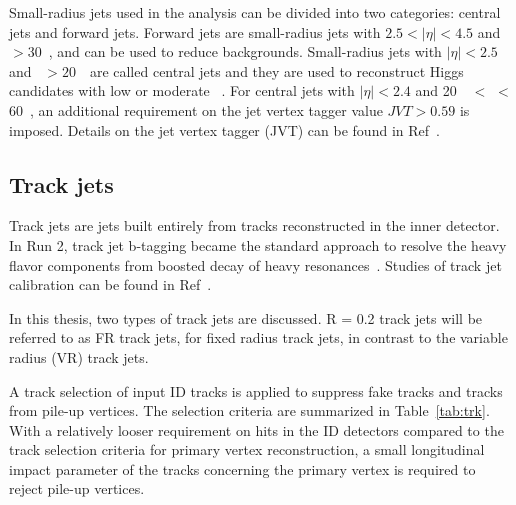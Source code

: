 \par Small-radius jets used in the analysis can be divided into two categories: central jets and forward jets. Forward jets are small-radius jets with $2.5 < |\eta| < 4.5$ and \pt~$> 30$~\GeV, and can be used to reduce backgrounds. 
Small-radius jets with $|\eta| < 2.5$ and \pt~$> 20$~\GeV~are called central jets and they are used to reconstruct Higgs candidates with low or moderate \pt~.
For central jets with $|\eta| < 2.4$ and 20~\GeV~$<$ \pt $<$ 60~\GeV, an additional requirement on the jet vertex tagger value $JVT > 0.59$ is imposed. Details on the jet vertex tagger (JVT) can be found in Ref~\cite{Aad:2015ina}.

\subsection{Track jets}
\label{sec:track}

\par Track jets are jets built entirely from tracks reconstructed in the inner detector. In Run 2, track jet b-tagging became the standard approach to resolve the heavy flavor components from boosted decay of heavy resonances~\cite{ATL-PHYS-PUB-2015-035,ATLAS-CONF-2016-039}. Studies of track jet calibration can be found in Ref~\cite{VanDenWollenberg:1981533}. 
\par In this thesis, two types of track jets are discussed. R = 0.2 track jets will be referred to as FR track jets, for fixed radius track jets, in contrast to the variable radius (VR) track jets.

\par A track selection of input ID tracks is applied to suppress fake tracks and tracks from pile-up vertices. The selection criteria are summarized in Table~\ref{tab:trk}. With a relatively looser requirement on hits in the ID detectors compared to the track selection criteria for primary vertex reconstruction, a small longitudinal impact parameter of the tracks concerning the primary vertex is required to reject pile-up vertices.

